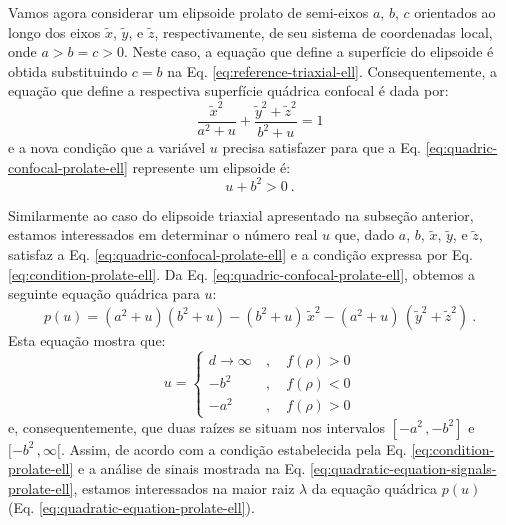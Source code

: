 Vamos agora considerar um elipsoide prolato de semi-eixos $a$, $b$, 
$c$ orientados ao longo dos eixos $\tilde{x}$, $\tilde{y}$, e 
$\tilde{z}$, respectivamente, de seu sistema de coordenadas local, onde $a > b = c > 0$.
Neste caso, a equação que define a superfície do elipsoide é obtida substituindo
$c = b$ na Eq. \ref{eq:reference-triaxial-ell}. Consequentemente, a equação que define a
respectiva superfície quádrica confocal é dada por:
\begin{equation}
\frac{\tilde{x}^{2}}{a^{2} + u} + \frac{\tilde{y}^{2} + \tilde{z}^{2}}{b^{2} + u} = 1
\label{eq:quadric-confocal-prolate-ell}
\end{equation}
e a nova condição que a variável $u$ precisa satisfazer para que a
Eq. \ref{eq:quadric-confocal-prolate-ell} represente um elipsoide é:
\begin{equation}
u + b^{2} > 0 \: .
\label{eq:condition-prolate-ell}
\end{equation}

Similarmente ao caso do elipsoide triaxial apresentado na subseção anterior,
estamos interessados em determinar o número real $u$ que, dado $a$, $b$, $\tilde{x}$, $\tilde{y}$,
e $\tilde{z}$, satisfaz a Eq. \ref{eq:quadric-confocal-prolate-ell} e a condição expressa por
Eq. \ref{eq:condition-prolate-ell}. Da Eq. \ref{eq:quadric-confocal-prolate-ell}, obtemos a
seguinte equação quádrica para $u$:
\begin{equation}
p(u) = (a^{2} + u)(b^{2} + u) - (b^{2} + u) \, \tilde{x}^{2}
- (a^{2} + u) \, (\tilde{y}^{2} + \tilde{z}^{2}) \: .
\label{eq:quadratic-equation-prolate-ell}
\end{equation}
Esta equação mostra que:
\begin{equation}
u = \begin{cases}
d \to \infty \: &, \quad f(\rho) > 0 \\
-b^{2} \: &, \quad f(\rho) < 0 \\
-a^{2} \: &, \quad f(\rho) > 0
\end{cases}
\label{eq:quadratic-equation-signals-prolate-ell}
\end{equation}
e, consequentemente, que duas raízes se situam nos intervalos $[ -a^{2} \, , -b^{2} ]$ 
e $[ -b^{2} \, , \infty [$. Assim, de acordo com a condição estabelecida pela
Eq. \ref{eq:condition-prolate-ell} e a análise de sinais mostrada na Eq. \ref{eq:quadratic-equation-signals-prolate-ell},
estamos interessados na maior raiz $\lambda$ da equação quádrica $p(u)$ (Eq. \ref{eq:quadratic-equation-prolate-ell}).

